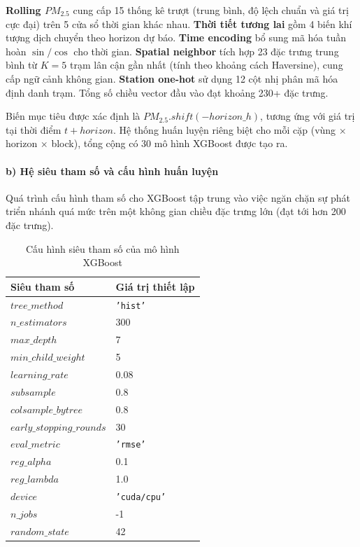 \textbf{Rolling $PM_{2.5}$} cung cấp 15 thống kê trượt (trung bình, độ lệch chuẩn và giá trị cực đại) trên 5 cửa sổ thời gian khác nhau. \textbf{Thời tiết tương lai} gồm 4 biến khí tượng dịch chuyển theo horizon dự báo. \textbf{Time encoding} bổ sung mã hóa tuần hoàn $\sin/\cos$ cho thời gian. \textbf{Spatial neighbor} tích hợp 23 đặc trưng trung bình từ $K=5$ trạm lân cận gần nhất (tính theo khoảng cách Haversine), cung cấp ngữ cảnh không gian. \textbf{Station one-hot} sử dụng 12 cột nhị phân mã hóa định danh trạm. Tổng số chiều vector đầu vào đạt khoảng 230+ đặc trưng.

Biến mục tiêu được xác định là $PM_{2.5}.shift(-horizon\_h)$, tương ứng với giá trị tại thời điểm $t + horizon$. Hệ thống huấn luyện riêng biệt cho mỗi cặp (vùng $\times$ horizon $\times$ block), tổng cộng có 30 mô hình XGBoost được tạo ra.

\paragraph{b) Hệ siêu tham số và cấu hình huấn luyện}

Quá trình cấu hình tham số cho XGBoost tập trung vào việc ngăn chặn sự phát triển nhánh quá mức trên một không gian chiều đặc trưng lớn (đạt tới hơn 200 đặc trưng). 

\begin{table}[H]
    \centering
    \caption{Cấu hình siêu tham số của mô hình XGBoost}
    \label{tab:xgboost_params_ch2}
    \renewcommand{\arraystretch}{1.3}
    \begin{tabular}{p{5.5cm} p{8.8cm}}
    \toprule
    \textbf{Siêu tham số} & \textbf{Giá trị thiết lập} \\
    \midrule
    $tree\_method$ & \texttt{'hist'} \\
    $n\_estimators$ & 300 \\
    $max\_depth$ & 7 \\
    $min\_child\_weight$ & 5 \\
    $learning\_rate$ & 0.08 \\
    $subsample$ & 0.8 \\
    $colsample\_bytree$ & 0.8 \\
    $early\_stopping\_rounds$ & 30 \\
    $eval\_metric$ & \texttt{'rmse'} \\
    $reg\_alpha$ & 0.1 \\
    $reg\_lambda$ & 1.0 \\
    $device$ & \texttt{'cuda/cpu'} \\
    $n\_jobs$ & -1 \\
    $random\_state$ & 42 \\
    \bottomrule
    \end{tabular}
\end{table}

